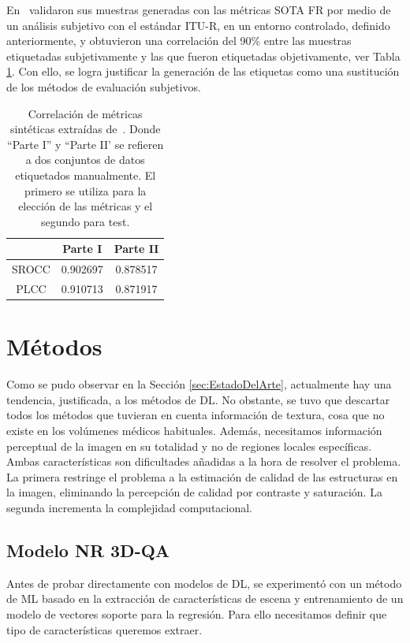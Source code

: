 En~\cite{ResSCNN} validaron sus muestras generadas con las métricas SOTA FR 
por medio de un análisis subjetivo con el estándar ITU-R, en
un entorno controlado, definido anteriormente, y obtuvieron una correlación del 
90\% entre las muestras 
etiquetadas subjetivamente y las que fueron etiquetadas objetivamente, ver Tabla \ref{tab:PseudoCorr}.
Con ello, se logra justificar la generación de las etiquetas como una sustitución 
de los métodos de evaluación subjetivos. 

\begin{table}[H]
  \centering 
  \scriptsize
  \begin{tabular}{|c|c|c|}
    \hline
    \rowcolor[HTML]{FFC702}
     & \textbf{Parte I} & \textbf{Parte II} \\
    \hline 
    SROCC & 0.902697 & 0.878517\\
    \hline
    PLCC & 0.910713 & 0.871917\\
    \hline
  \end{tabular}
  \caption[Correlación de métricas sintéticas.]{
  Correlación de métricas sintéticas extraídas de~\cite{ResSCNN}.
  Donde ``Parte I'' y ``Parte II' se refieren a dos conjuntos de datos etiquetados 
  manualmente. El primero se utiliza para la elección de las métricas y el segundo 
  para test.
}
  \label{tab:PseudoCorr}
\end{table}


\section{Métodos}
Como se pudo observar en la Sección \ref{sec:EstadoDelArte}, actualmente hay una 
tendencia, justificada, a los métodos de DL. No obstante, se tuvo 
que descartar todos los métodos que tuvieran en cuenta información de textura, 
cosa que no existe en los volúmenes médicos habituales. Además, necesitamos 
información perceptual de la imagen en su totalidad y no de regiones locales 
específicas. Ambas características son dificultades añadidas a la hora 
de resolver el problema. La primera restringe el problema 
a la estimación de calidad de las estructuras en la imagen, eliminando la 
percepción de calidad por contraste y saturación. La segunda incrementa 
la complejidad computacional.

\subsection{Modelo NR 3D-QA}
\label{sec:NR3DQA}
Antes de probar directamente con modelos de DL, se experimentó con un método de 
ML basado en la extracción de características de escena y entrenamiento de un 
modelo de vectores soporte para la regresión. Para ello necesitamos definir 
que tipo de características queremos extraer. 

